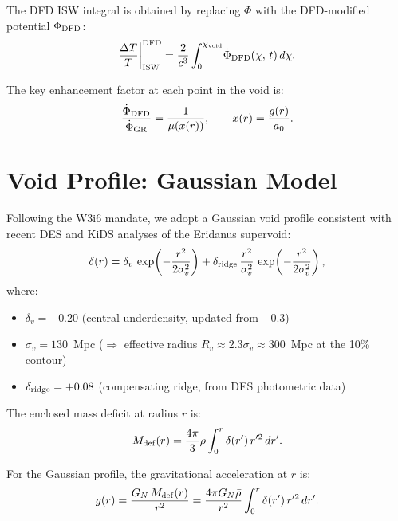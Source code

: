 \documentclass[11pt]{article}
\newcommand{\GN}{G_N}
\newcommand{\aM}{a_0}
\newcommand{\mufd}{\mu}
\begin{document}
The DFD ISW integral is obtained by replacing $\Phi$ with the
DFD-modified potential $\Phi_{\rm DFD}$:
\begin{equation}
\frac{\Delta T}{T}\bigg|_{\rm ISW}^{\rm DFD}
= \frac{2}{c^3}\int_0^{\chi_{\rm void}}\!\dot{\Phi}_{\rm DFD}(\chi,\,t)\,d\chi.
\label{eq:ISW-DFD}
\end{equation}

The key enhancement factor at each point in the void is:
\begin{equation}
\frac{\dot{\Phi}_{\rm DFD}}{\dot{\Phi}_{\rm GR}}
= \frac{1}{\mufd(x(r))},
\qquad x(r) = \frac{g(r)}{\aM}.
\label{eq:enhancement}
\end{equation}

\section{Void Profile: Gaussian Model}
\label{sec:void-profile}

Following the W3i6 mandate, we adopt a Gaussian void profile consistent
with recent DES and KiDS analyses of the Eridanus supervoid:
\begin{equation}
\delta(r) = \delta_v\,\exp\!\left(-\frac{r^2}{2\sigma_v^2}\right)
+ \delta_{\rm ridge}\,\frac{r^2}{\sigma_v^2}\,
\exp\!\left(-\frac{r^2}{2\sigma_v^2}\right),
\label{eq:gaussian-void}
\end{equation}
where:
\begin{itemize}[nosep]
\item $\delta_v = -0.20$ (central underdensity, updated from $-0.3$)
\item $\sigma_v = 130$~Mpc ($\Rightarrow$ effective radius
  $R_v \approx 2.3\sigma_v \approx 300$~Mpc at the 10\% contour)
\item $\delta_{\rm ridge} = +0.08$ (compensating ridge, from DES photometric
  data)
\end{itemize}

The enclosed mass deficit at radius $r$ is:
\begin{equation}
M_{\rm def}(r) = \frac{4\pi}{3}\bar{\rho}\int_0^r\delta(r')\,r'^2\,dr'.
\label{eq:mass-deficit}
\end{equation}

For the Gaussian profile, the gravitational acceleration at $r$ is:
\begin{equation}
g(r) = \frac{\GN\,M_{\rm def}(r)}{r^2}
= \frac{4\pi\GN\bar{\rho}}{r^2}\int_0^r\delta(r')\,r'^2\,dr'.
\label{eq:g-gaussian}
\end{equation}
\end{document}
